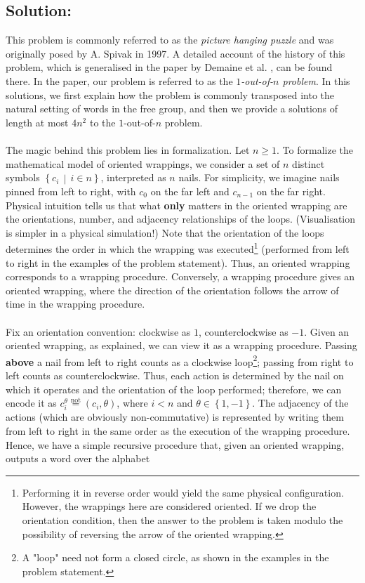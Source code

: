 \documentclass[11pt, a4paper, oneside]{article}
\newcommand{\solution}[1][]{\subsection*{#1}\hfill \par}
\theoremstyle{remark}
\theoremstyle{lemma}
\begin{document}
\solution[Solution:]
This problem is commonly referred to as the \emph{picture hanging puzzle} and was originally posed by A. Spivak in 1997. A detailed account of the history of this problem, which is generalised in the paper by Demaine et al. \cite{demaine2012picture}, can be found there. In the paper, our problem is referred to as the \textit{$1$-out-of-$n$ problem}. In this solutions, we first explain how the problem is commonly transposed into the natural setting of words in the free group, and then we provide a solutions of length at most $4n^2$ to the $1$-out-of-$n$ problem.
\\\\
The magic behind this problem lies in formalization. Let \( n \geq 1 \). To formalize the mathematical model of oriented wrappings, we consider a set of \( n \) distinct symbols \( \left\{ c_i \,\middle|\, i \in n \right\} \), interpreted as \( n \) nails. For simplicity, we imagine nails pinned from left to right, with \( c_0 \) on the far left and \( c_{n-1} \) on the far right. Physical intuition tells us that what \textbf{only} matters in the oriented wrapping are the orientations, number, and adjacency relationships of the loops. (Visualisation is simpler in a physical simulation!) Note that the orientation of the loops determines the order in which the wrapping was executed\footnote{Performing it in reverse order would yield the same physical configuration. However, the wrappings here are considered oriented. If we drop the orientation condition, then the answer to the problem is taken modulo the possibility of reversing the arrow of the oriented wrapping.} (performed from left to right in the examples of the problem statement). Thus, an oriented wrapping corresponds to a wrapping procedure. Conversely, a wrapping procedure gives an oriented wrapping, where the direction of the orientation follows the arrow of time in the wrapping procedure.
\\\\
Fix an orientation convention: clockwise as \(1\), counterclockwise as \(-1\). Given an oriented wrapping, as explained, we can view it as a wrapping procedure. Passing \textbf{above} a nail from left to right counts as a clockwise loop\footnote{A "loop" need not form a closed circle, as shown in the examples in the problem statement.}; passing from right to left counts as counterclockwise. Thus, each action is determined by the nail on which it operates and the orientation of the loop performed; therefore, we can encode it as \(c_i^{\theta} \overset{\mathrm{not}}{=} \left(c_i, \theta\right)\), where \(i < n\) and \(\theta \in \left\{1, -1\right\}\). The adjacency of the actions (which are obviously non-commutative) is represented by writing them from left to right in the same order as the execution of the wrapping procedure. Hence, we have a simple recursive procedure that, given an oriented wrapping, outputs a word over the alphabet 
\end{document}
